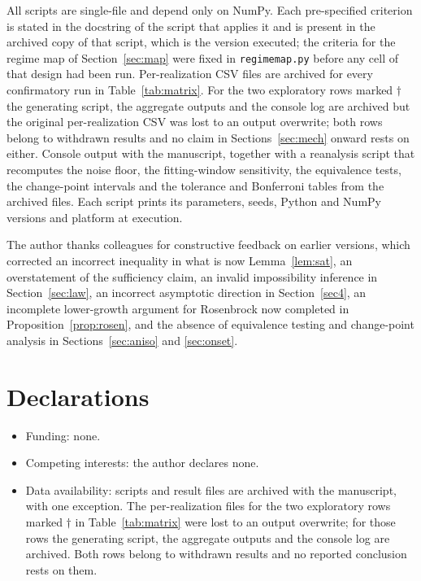 \documentclass[pdflatex,sn-mathphys-num]{sn-jnl}
\theoremstyle{thmstyleone}
\theoremstyle{thmstyletwo}
\theoremstyle{thmstylethree}
\begin{document}
All scripts are single-file and depend only on NumPy. Each pre-specified criterion is stated in the docstring of the script that applies it and is present in the archived copy of that script, which is the version executed; the criteria for the regime map of Section~\ref{sec:map} were fixed in \texttt{regimemap.py} before any cell of that design had been run. Per-realization CSV files are archived for every confirmatory run in Table~\ref{tab:matrix}. For the two exploratory rows marked $\dagger$ the generating script, the aggregate outputs and the console log are archived but the original per-realization CSV was lost to an output overwrite; both rows belong to withdrawn results and no claim in Sections~\ref{sec:mech} onward rests on either. Console output with the manuscript, together with a reanalysis script that recomputes the noise floor, the fitting-window sensitivity, the equivalence tests, the change-point intervals and the tolerance and Bonferroni tables from the archived files. Each script prints its parameters, seeds, Python and NumPy versions and platform at execution.

The author thanks colleagues for constructive feedback on earlier versions, which corrected an incorrect inequality in what is now Lemma~\ref{lem:sat}, an overstatement of the sufficiency claim, an invalid impossibility inference in Section~\ref{sec:law}, an incorrect asymptotic direction in Section~\ref{sec4}, an incomplete lower-growth argument for Rosenbrock now completed in Proposition~\ref{prop:rosen}, and the absence of equivalence testing and change-point analysis in Sections~\ref{sec:aniso} and \ref{sec:onset}.

\section*{Declarations}
\begin{itemize}
\item Funding: none.
\item Competing interests: the author declares none.
\item Data availability: scripts and result files are archived with the manuscript, with one exception. The per-realization files for the two exploratory rows marked $\dagger$ in Table~\ref{tab:matrix} were lost to an output overwrite; for those rows the generating script, the aggregate outputs and the console log are archived. Both rows belong to withdrawn results and no reported conclusion rests on them.
\end{itemize}
\end{document}
